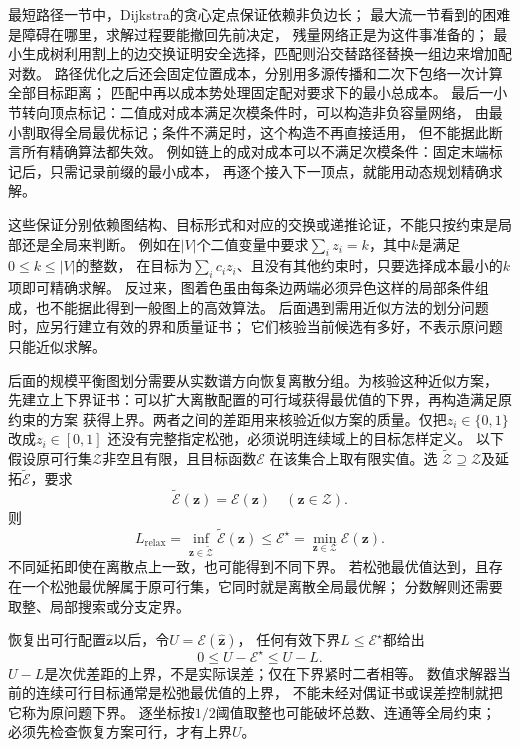 最短路径一节中，Dijkstra的贪心定点保证依赖非负边长；
最大流一节看到的困难是障碍在哪里，求解过程要能撤回先前决定，
残量网络正是为这件事准备的；
最小生成树利用割上的边交换证明安全选择，匹配则沿交替路径替换一组边来增加配对数。
路径优化之后还会固定位置成本，分别用多源传播和二次下包络一次计算全部目标距离；
匹配中再以成本势处理固定配对要求下的最小总成本。
最后一小节转向顶点标记：二值成对成本满足次模条件时，可以构造非负容量网络，
由最小割取得全局最优标记；条件不满足时，这个构造不再直接适用，
但不能据此断言所有精确算法都失效。
例如链上的成对成本可以不满足次模条件：固定末端标记后，只需记录前缀的最小成本，
再逐个接入下一顶点，就能用动态规划精确求解。

这些保证分别依赖图结构、目标形式和对应的交换或递推论证，不能只按约束是局部还是全局来判断。
例如在\(|V|\)个二值变量中要求\(\sum_i z_i=k\)，其中\(k\)是满足\(0\leq k\leq|V|\)的整数，
在目标为\(\sum_i c_i z_i\)、且没有其他约束时，只要选择成本最小的\(k\)项即可精确求解。
反过来，图着色虽由每条边两端必须异色这样的局部条件组成，也不能据此得到一般图上的高效算法。
后面遇到需用近似方法的划分问题时，应另行建立有效的界和质量证书；
它们核验当前候选有多好，不表示原问题只能近似求解。

后面的规模平衡图划分需要从实数谱方向恢复离散分组。为核验这种近似方案，
先建立上下界证书：可以扩大离散配置的可行域获得最优值的下界，再构造满足原约束的方案
获得上界。两者之间的差距用来核验近似方案的质量。仅把\(z_i\in\{0,1\}\)改成\(z_i\in[0,1]\)
还没有完整指定松弛，必须说明连续域上的目标怎样定义。
以下假设原可行集\(\mathcal Z\)非空且有限，且目标函数\(\mathcal E\)
在该集合上取有限实值。选
\(\widetilde{\mathcal Z}\supseteq\mathcal Z\)及延拓\(\widetilde{\mathcal E}\)，要求
\[
  \widetilde{\mathcal E}(\bm z)=\mathcal E(\bm z)\quad(\bm z\in\mathcal Z).
\]
则
\[
  L_{\mathrm{relax}}
  =\inf_{\bm z\in\widetilde{\mathcal Z}}\widetilde{\mathcal E}(\bm z)
  \leq \mathcal E^\star
  =\min_{\bm z\in\mathcal Z}\mathcal E(\bm z).
\]
不同延拓即使在离散点上一致，也可能得到不同下界。
若松弛最优值达到，且存在一个松弛最优解属于原可行集，它同时就是离散全局最优解；
分数解则还需要取整、局部搜索或分支定界。

恢复出可行配置\(\widehat{\bm z}\)以后，令\(U=\mathcal E(\widehat{\bm z})\)，
任何有效下界\(L\leq\mathcal E^\star\)都给出
\[
  0\leq U-\mathcal E^\star\leq U-L.
\]
\(U-L\)是次优差距的上界，不是实际误差；仅在下界紧时二者相等。
数值求解器当前的连续可行目标通常是松弛最优值的上界，
不能未经对偶证书或误差控制就把它称为原问题下界。
逐坐标按\(1/2\)阈值取整也可能破坏总数、连通等全局约束；
必须先检查恢复方案可行，才有上界\(U\)。

